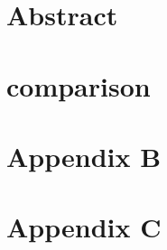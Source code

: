 




\maketitle
\vfill
\section{Abstract}
\newpage
\tableofcontents
\newpage


\newpage

\newpage

\newpage

\newpage

\newpage
\section{comparison}
\newpage

\newpage
\section{Appendix B}
\newpage
\section{Appendix C}
\newpage





